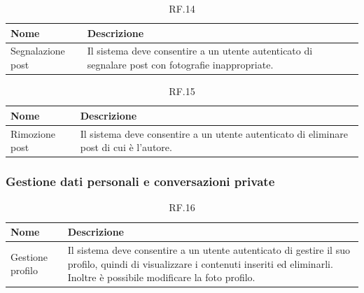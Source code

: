 \documentclass{natourDoc}
\begin{document}
\begin{table}[H]
	\centering
	\begin{tabular}{ |p{5cm}|p{10.3cm}| }
		\hline
		\rowcolor{PineGreen!70}
		\textbf{Nome}     & \textbf{Descrizione}                                                                \\
		\hline
		Segnalazione post & Il sistema deve consentire a un utente autenticato di segnalare post con fotografie
		inappropriate.                                                                                          \\
		\hline
	\end{tabular}
	\caption{RF.14}

\end{table}

\begin{table}[H]
	\centering
	\begin{tabular}{ |p{5cm}|p{10.3cm}| }
		\hline
		\rowcolor{PineGreen!70}
		\textbf{Nome}  & \textbf{Descrizione}                                                        \\
		\hline
		Rimozione post & Il sistema deve consentire a un utente autenticato di eliminare post di cui
		è l'autore.                                                                                  \\
		\hline
	\end{tabular}
	\caption{RF.15}

\end{table}

\subsubsection{Gestione dati personali e conversazioni private}
\begin{table}[H]
	\centering
	\begin{tabular}{ |p{5cm}|p{10.3cm}| }
		\hline
		\rowcolor{PineGreen!70}
		\textbf{Nome}    & \textbf{Descrizione}                                                                    \\
		\hline
		Gestione profilo & Il sistema deve consentire a un utente autenticato di gestire il suo profilo,
		quindi di visualizzare i contenuti inseriti ed eliminarli. Inoltre è possibile modificare la foto profilo. \\
		\hline
	\end{tabular}
	\caption{RF.16}

\end{table}
\end{document}
